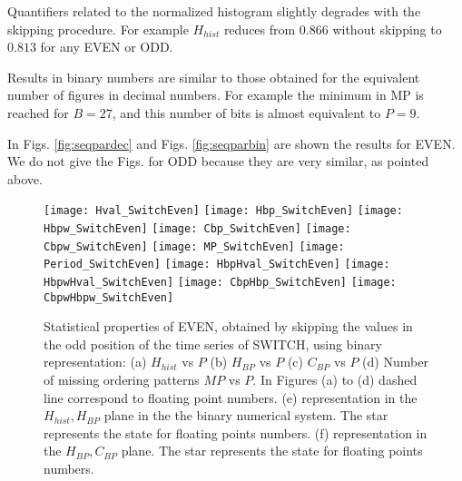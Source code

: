 Quantifiers related to the normalized histogram slightly degrades with the skipping procedure. For example $H_{hist}$ reduces from $0.866$ without skipping to $0.813$ for any EVEN or ODD. 

Results in binary numbers are similar to those obtained for the equivalent number of figures in decimal numbers. For example the minimum in MP is reached for $B=27$, and this number of bits is almost equivalent to $P=9$. 

In Figs. \ref{fig:seqpardec} and Figs. \ref{fig:seqparbin} are shown the results for EVEN. We do not give the Figs. for ODD because they are very similar, as pointed above.

\begin{figure}
	\texttt{[image: Hval\_SwitchEven]}
	\texttt{[image: Hbp\_SwitchEven]}
	\texttt{[image: Hbpw\_SwitchEven]}
	\texttt{[image: Cbp\_SwitchEven]}
	\texttt{[image: Cbpw\_SwitchEven]}
	\texttt{[image: MP\_SwitchEven]}
	\texttt{[image: Period\_SwitchEven]}
	\texttt{[image: HbpHval\_SwitchEven]}
	\texttt{[image: HbpwHval\_SwitchEven]}
	\texttt{[image: CbpHbp\_SwitchEven]}
	\texttt{[image: CbpwHbpw\_SwitchEven]}
	\caption{Statistical properties of EVEN, obtained by skipping the values in the odd position of the time series of  SWITCH,  using binary representation: (a) $H_{hist}$ vs $P$ (b) $H_{BP}$ vs $P$ (c) $C_{BP}$ vs $P$ (d) Number of missing ordering patterns $MP$ vs $P$. In Figures (a) to (d) dashed line correspond to floating point numbers. (e) representation in the $H_{hist},H_{BP}$ plane in the the binary numerical system.  The star represents the state for floating points numbers. (f) representation in the $H_{BP},C_{BP}$ plane.  The star represents the state for floating points numbers.  } \label{fig:seqimparbin}
\end{figure}


